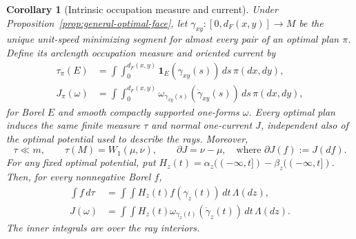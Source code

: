 \documentclass[11pt,reqno]{amsart}
\newtheorem{corollary}[theorem]{Corollary}
\theoremstyle{definition}
\theoremstyle{remark}
\numberwithin{equation}{section}
\begin{document}
\begin{corollary}[Intrinsic occupation measure and current]
\label{cor:general-occupation-current}
Under Proposition~\ref{prop:general-optimal-face}, let
\(\gamma_{xy}:[0,d_F(x,y)]\to M\) be the unique unit-speed minimizing
segment for almost every pair of an optimal plan \(\pi\). Define its
arclength occupation measure and oriented current by
\begin{equation}
\label{eq:general-intrinsic-occupation}
\begin{aligned}
 \tau_\pi(E)&=\int\!\int_0^{d_F(x,y)}
                   \mathbf1_E(\gamma_{xy}(s))\,ds\,\pi(dx,dy),\\
 J_\pi(\omega)&=\int\!\int_0^{d_F(x,y)}
       \omega_{\gamma_{xy}(s)}(\dot\gamma_{xy}(s))\,ds\,\pi(dx,dy),
\end{aligned}
\end{equation}
for Borel \(E\) and smooth compactly supported one-forms \(\omega\).
Every optimal plan induces the same finite measure \(\tau\) and normal
one-current \(J\), independent also of the optimal potential used to
describe the rays. Moreover,
\[
 \tau\ll m,\qquad \tau(M)=W_1(\mu,\nu),\qquad
 \partial J=\nu-\mu,
 \quad\text{where }\partial J(f):=J(df).
\]
For any fixed optimal potential, put
\(H_z(t)=\alpha_z(({-\infty},t])-\beta_z(({-\infty},t])\).
Then, for every nonnegative Borel \(f\),
\begin{equation}
\label{eq:general-occupation-cut-flux}
\begin{aligned}
 \int f\,d\tau
   &=\int\!\int H_z(t)f(\gamma_z(t))\,dt\,\Lambda(dz),\\
 J(\omega)
   &=\int\!\int H_z(t)
       \omega_{\gamma_z(t)}(\dot\gamma_z(t))\,dt\,\Lambda(dz).
\end{aligned}
\end{equation}
The inner integrals are over the ray interiors.
\end{corollary}
\end{document}
